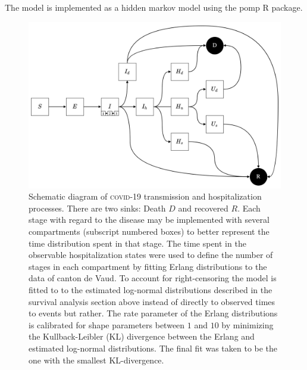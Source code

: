 The model is implemented as a hidden markov model using the pomp R package\cite[-8\baselineskip]{King:StatisticalInferencePartially:2015}. 
 \begin{figure}[!htb]
\begin{center}
\includegraphics{fig_covid-switzerland-npi/fig_supp/diagram.png}
\caption[Schematic diagram of \textsc{covid}-19 transmission and hospitalization processes]{Schematic diagram of \textsc{covid}-19 transmission and hospitalization processes. There are two sinks: Death $D$ and recovered $R$. Each stage with regard to the disease may be implemented with several compartments (subscript numbered boxes) to better represent the time distribution spent in that stage. The time spent in the observable hospitalization states were used to define the number of stages in each compartment by fitting Erlang distributions to the data of canton de Vaud. To account for right-censoring the model is fitted to to the estimated log-normal distributions described in the survival analysis section above instead of directly to observed times to events but rather. The rate parameter of the Erlang distributions is calibrated for shape parameters between $1$ and $10$ by minimizing the Kullback-Leibler (KL) divergence between the Erlang and estimated log-normal distributions. The final fit was taken to be the one with the smallest KL-divergence.}
\label{fig:covid-ch-diagram}
\end{center}
\end{figure}
